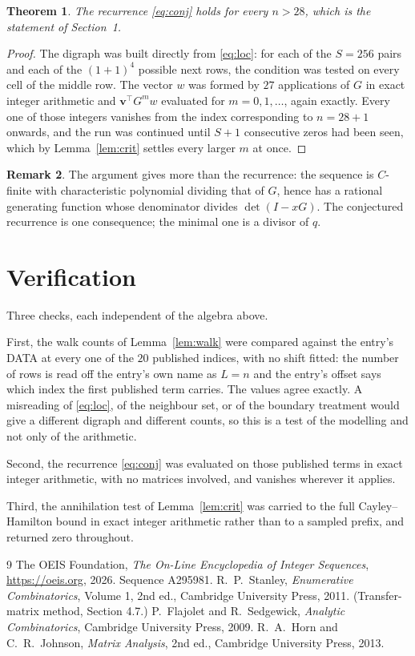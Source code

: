 \documentclass[11pt,a4paper]{article}
\theoremstyle{plain}
\newtheorem{theorem}{Theorem}
\theoremstyle{definition}
\newtheorem{remark}[theorem]{Remark}
\begin{document}
\begin{theorem}
The recurrence \eqref{eq:conj} holds for every $n>28$, which is the statement of
Section~1.
\end{theorem}

\begin{proof}
The digraph was built directly from \eqref{eq:loc}: for each of the $S=256$ pairs and each
of the $(1+1)^{4}$ possible next rows, the condition was tested on every cell of
the middle row. The vector $w$ was formed by $27$ applications of $G$ in exact integer
arithmetic and $\mathbf{v}^{\!\top}G^{m}w$ evaluated for $m=0,1,\dots$, again exactly.
Every one of those integers vanishes from the index corresponding to $n=28+1$ onwards,
and the run was continued until $S+1$ consecutive zeros had been seen, which by
Lemma~\ref{lem:crit} settles every larger $m$ at once.
\end{proof}

\begin{remark}
The argument gives more than the recurrence: the sequence is $C$-finite with characteristic
polynomial dividing that of $G$, hence has a rational generating function whose denominator
divides $\det(I-xG)$. The conjectured recurrence is one consequence; the minimal one is a
divisor of $q$.
\end{remark}

\section{Verification}

Three checks, each independent of the algebra above.

First, the walk counts of Lemma~\ref{lem:walk} were compared against the entry's DATA at
every one of the $20$ published indices, with no shift fitted: the number of rows is
read off the entry's own name as $L=n$ and the entry's offset says which index the first
published term carries. The values agree exactly. A misreading of \eqref{eq:loc}, of the
neighbour set, or of the boundary treatment would give a different digraph and different
counts, so this is a test of the modelling and not only of the arithmetic.

Second, the recurrence \eqref{eq:conj} was evaluated on those published terms in exact
integer arithmetic, with no matrices involved, and vanishes wherever it applies.

Third, the annihilation test of Lemma~\ref{lem:crit} was carried to the full
Cayley--Hamilton bound in exact integer arithmetic rather than to a sampled prefix, and
returned zero throughout.

\begin{thebibliography}{9}
 The OEIS Foundation, \emph{The On-Line Encyclopedia of Integer
Sequences}, \url{https://oeis.org}, 2026. Sequence A295981.
 R.~P.~Stanley, \emph{Enumerative Combinatorics}, Volume 1, 2nd ed.,
Cambridge University Press, 2011. (Transfer-matrix method, Section 4.7.)
 P.~Flajolet and R.~Sedgewick, \emph{Analytic Combinatorics}, Cambridge
University Press, 2009.
 R.~A.~Horn and C.~R.~Johnson, \emph{Matrix Analysis}, 2nd ed., Cambridge
University Press, 2013.
\end{thebibliography}
\end{document}
